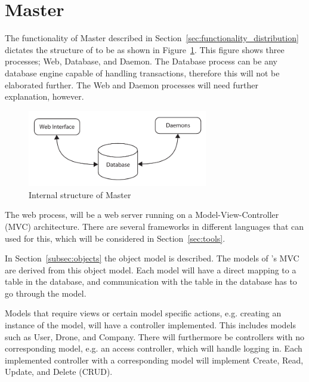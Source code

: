 \section{Master}

The functionality of Master described in Section~\ref{sec:functionality_distribution} dictates the structure of  to be as shown in Figure~\ref{fig:int_struct_m}.
This figure shows three processes; Web, Database, and Daemon.
The Database process can be any database engine capable of handling transactions, therefore this will not be elaborated further.
The Web and Daemon processes will need further explanation, however. \\

\begin{figure}[htb]
    \centering
    \includegraphics[width=0.7\textwidth]{gfx/master_internal_structure.pdf}
    \caption{Internal structure of Master}
    \label{fig:int_struct_m}
\end{figure}

The web process,  will be a web server running on a Model-View-Controller (MVC) architecture.
There are several frameworks in different languages that can used for this, which will be considered in Section~\ref{sec:tools}.


In Section~\ref{subsec:objects} the object model is described.
The models of 's MVC are derived from this object model.
Each model will have a direct mapping to a table in the database, and communication with the table in the database has to go through the model.

Models that require views or certain model specific actions, e.g. creating an instance of the model, will have a controller implemented.
This includes models such as User, Drone, and Company.
There will furthermore be controllers with no corresponding model, e.g. an access controller, which will handle logging in.
Each implemented controller with a corresponding model will implement Create, Read, Update, and Delete (CRUD).

